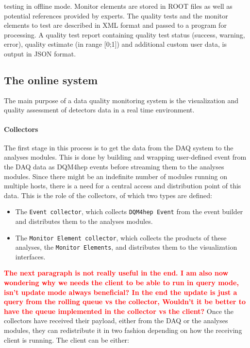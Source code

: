 \documentclass{webofc}
\begin{document}
\noindent testing in offline mode. Monitor elements are stored in ROOT files as well as potential 
references provided by experts. 
The quality tests and the monitor elements to test are described in XML format and passed to 
a program for processing. A quality test report containing quality test status (success, warning, error), quality estimate 
(in range [0;1]) and additional custom user data, is output in JSON format.

\subsection{The online system}
\label{subsec:online}
The main purpose of a data quality monitoring system is the visualization and quality assessment of detectors data in a real time environment.

\paragraph{Collectors}\label{par:Collectors}
The first stage in this process is to get the data from the DAQ system to the analyses modules.
This is done by building and wrapping user-defined event from the DAQ data as DQM4hep events before streaming them to the analyses modules.
Since there might be an indefinite number of modules running on multiple hosts, there is a need for a central access and distribution point of this data. This is the role of the collectors, of which two types are defined:

\begin{itemize}
  \item The \texttt{Event collector}, which collects \texttt{DQM4hep Event} from the event builder and distributes them to the analyses modules. 
  \item The \texttt{Monitor Element collector}, which collects the products of these analyses, the \texttt{Monitor Elements}, and distributes them to the visualization interfaces.
\end{itemize}

\textcolor{red}{\textbf{The next paragraph is not really useful in the end. I am also now wondering why we needs the client to be able to run in query mode, isn't update mode always beneficial? In the end the update is just a query from the rolling queue vs the collector, Wouldn't it be better to have the queue implemented in the collector vs the client?}}
Once the collectors have received their payload, either from the DAQ or the analyses modules, they can redistribute it in two fashion depending on how the receiving client is running. The client can be either:
\end{document}
